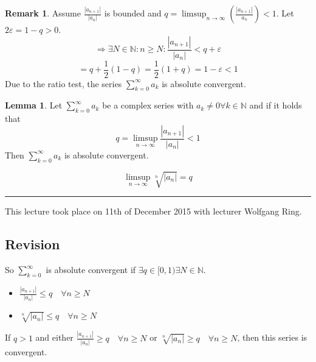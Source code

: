 \documentclass[a4paper,landscape,twocolumn]{article}
\theoremstyle{definition}
\newtheorem{rem}{Remark}
\newtheorem{lemma}{Lemma}
\newcommand\abs[1]{\left|#1\right|}
\newcommand\meta[3]{\hrule{} This #1 took place on #2 with lecturer #3.\par}
\begin{document}
\begin{rem}
  Assume $\frac{\abs{a_{n+1}}}{\abs{a_n}}$ is bounded and $q = \limsup_{n\to\infty}\left(\frac{\abs{a_{n+1}}}{a_n}\right) < 1$.
  Let $2 \varepsilon = 1 - q > 0$.
  \[ \Rightarrow \exists N \in \mathbb N: n \geq N: \frac{\abs{a_{n+1}}}{\abs{a_n}} < q + \varepsilon \]
  \[ = q + \frac12 \left(1 - q\right) = \frac12 (1 + q) = 1 - \varepsilon < 1 \]
  Due to the ratio test, the series $\sum_{k=0}^\infty a_k$ is absolute convergent.
\end{rem}

\begin{lemma}
  Let $\sum_{k=0}^\infty a_k$ be a complex series with $a_k \neq 0 \forall k \in \mathbb N$
  and if it holds that
  \[ q = \limsup_{n\to\infty} \frac{\abs{a_{n+1}}}{\abs{a_n}} < 1 \]
  Then $\sum_{k=0}^\infty a_k$ is absolute convergent.

  \[ \limsup_{n\to\infty} \sqrt[n]{\abs{a_n}} = q \]
\end{lemma}

\meta{lecture}{11th of December 2015}{Wolfgang Ring}

\subsection{Revision}
%
So $\sum_{k=0}^\infty$ is absolute convergent if $\exists q \in [0,1) \exists N \in \mathbb N$.

\begin{itemize}
  \item $\frac{\abs{a_{n+1}}}{\abs{a_n}} \leq q \quad\forall n \geq N$
  \item $\sqrt[n]{\abs{a_n}} \leq q \quad \forall n \geq N$
\end{itemize}

If $q > 1$ and either $\frac{\abs{a_{n+1}}}{\abs{a_n}} \geq q \quad \forall n \geq N$
or $\sqrt[n]{\abs{a_n}} \geq q \quad\forall n \geq N$, then this series is convergent.
\end{document}
